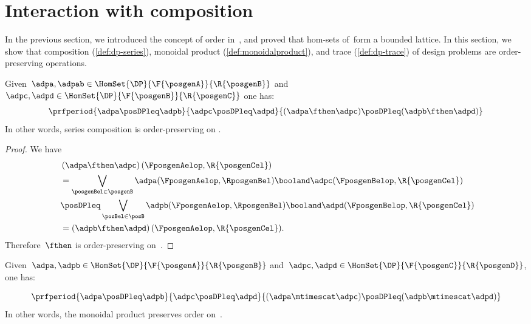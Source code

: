 
\section{Interaction with composition}
In the previous section, we introduced the concept of order in~\DP, and proved that hom-sets of~\DP form a bounded lattice.
In this section, we show that composition (\cref{def:dp-series}), monoidal product (\cref{def:monoidalproduct}), and trace (\cref{def:dp-trace}) of design problems are order-preserving operations.

\begin{lemma}
	\label{lem:series_pres_order}
	Given~$\adpa,\adpab \in \HomSet{\DP}{\F{\posgenA}}{\R{\posgenB}}$ and~$\adpc,\adpd \in \HomSet{\DP}{\F{\posgenB}}{\R{\posgenC}}$ one has:
	\begin{equation}
		\prfperiod{
			\adpa\posDPleq \adpb
		}{
			\adpc\posDPleq \adpd
		}{
			(\adpa\fthen \adpc) \posDPleq (\adpb\fthen \adpd)
		}
	\end{equation}
	In other words, series composition is order-preserving on \DP.
\end{lemma}

\begin{proof}
	We have
	\begin{equation}
		\label{eq:series_pres_ord}
		\begin{aligned}
			~ & \left( \adpa\fthen \adpc\right)(\FposgenAelop,\R{\posgenCel})                                                     \\
			  & = \bigvee_{\posgenBel\in \posgenB}\adpa(\FposgenAelop,\RposgenBel)\booland \adpc(\FposgenBelop,\R{\posgenCel})    \\
			  & \posDPleq \bigvee_{\posBel\in \posB} \adpb(\FposgenAelop,\RposgenBel)\booland \adpd(\FposgenBelop,\R{\posgenCel}) \\
			  & =\left( \adpb\fthen \adpd\right)(\FposgenAelop,\R{\posgenCel}).
		\end{aligned}
	\end{equation}
	Therefore~$\fthen$ is order-preserving on~\DP.
\end{proof}

\begin{lemma}
	\label{lem:tens_pres_order}
	Given~$\adpa,\adpb \in \HomSet{\DP}{\F{\posgenA}}{\R{\posgenB}}$ and~$\adpc,\adpd \in \HomSet{\DP}{\F{\posgenC}}{\R{\posgenD}}$, one has:

	\begin{equation}
		\prfperiod{
			\adpa\posDPleq \adpb
		}{
			\adpc\posDPleq \adpd
		}{
			(\adpa\mtimescat \adpc )\posDPleq (\adpb\mtimescat \adpd)
		}
	\end{equation}
	In other words, the monoidal product preserves order on~\DP.
\end{lemma}

